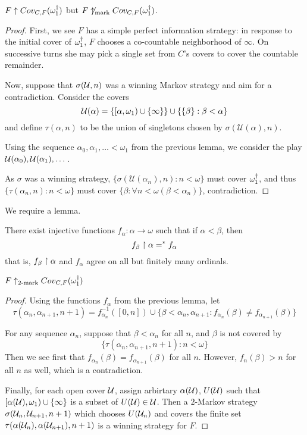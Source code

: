   \begin{example}
    $F \uparrow Cov_{C,F}(\omega_1^\dagger)$ but $F \not\uparrow_{\text{mark}} Cov_{C,F}(\omega_1^\dagger)$.
  \end{example}

  \begin{proof}
    First, we see $F$ has a simple perfect information strategy: in response to the initial cover of $\omega_1^\dagger$, $F$ chooses a co-countable neighborhood of $\infty$. On successive turns she may pick a single set from $C$'s covers to cover the countable remainder.

    Now, suppose that $\sigma(\mathcal{U}, n)$ was a winning Markov strategy and aim for a contradiction. Consider the covers \[\mathcal{U}(\alpha) = \{[\alpha,\omega_1)\cup\{\infty\}\} \cup \{\{\beta\}:\beta < \alpha\}\] and define $\tau(\alpha,n)$ to be the union of singletons chosen by $\sigma(\mathcal{U}(\alpha),n)$. 

    Using the sequence $\alpha_0, \alpha_1,\dots<\omega_1$ from the previous lemma, we consider the play $\mathcal{U}(\alpha_0),\mathcal{U}(\alpha_1),\dots$.

    As $\sigma$ was a winning strategy, $\{\sigma(\mathcal{U}(\alpha_n),n): n<\omega\}$ must cover $\omega_1^\dagger$, and thus $\{\tau(\alpha_n,n): n<\omega\}$ must cover $\{\beta:\forall n<\omega (\beta < \alpha_n)\}$, contradiction.
  \end{proof}

  We require a lemma.

  \begin{lemma}
    There exist injective functions $f_\alpha:\alpha\to\omega$ such that if $\alpha<\beta$, then \[f_\beta\restriction\alpha =^* f_\alpha\] that is, $f_\beta\restriction\alpha$ and $f_\alpha$ agree on all but finitely many ordinals.
  \end{lemma}

  \begin{example}
    $F \uparrow_{2\text{-mark}} Cov_{C,F}(\omega_1^\dagger)$
  \end{example}

  \begin{proof}
    Using the functions $f_\alpha$ from the previous lemma, let \[\tau(\alpha_n,\alpha_{n+1},n+1)=f_{\alpha_n}^{-1}([0,n]) \cup \{\beta<\alpha_n,\alpha_{n+1} : f_{\alpha_n}(\beta)\not=f_{\alpha_{n+1}}(\beta)\}\]

    For any sequence $\alpha_n$, suppose that $\beta<\alpha_n$ for all $n$, and $\beta$ is not covered by \[\{\tau(\alpha_n,\alpha_{n+1},n+1): n<\omega\}\] Then we see first that $f_{\alpha_n}(\beta)=f_{\alpha_{n+1}}(\beta)$ for all $n$. However, $f_{n}(\beta)>n$ for all $n$ as well, which is a contradiction.

    Finally, for each open cover $\mathcal{U}$, assign arbirtary $\alpha(\mathcal{U})$, $U(\mathcal{U})$ such that $[\alpha(\mathcal{U}),\omega_1)\cup\{\infty\}$ is a subset of $U(\mathcal{U})\in\mathcal{U}$. Then a $2$-Markov strategy $\sigma(\mathcal{U}_n,\mathcal{U}_{n+1},n+1)$ which chooses $U(\mathcal{U}_n)$ and covers the finite set $\tau(\alpha(\mathcal{U}_n),\alpha(\mathcal{U}_{n+1}),n+1)$ is a winning strategy for $F$.
  \end{proof}

